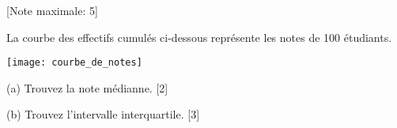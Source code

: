 \begin{question}
  \hspace*{\fill} [Note maximale: 5]\par
  \noindent La courbe des effectifs cumulés ci-dessous représente les notes de 100 étudiants.\par

  \texttt{[image: courbe\_de\_notes]}  

  (a) Trouvez la note médianne.\hspace*{\fill} [2]\par
  (b) Trouvez l'intervalle interquartile.\hspace*{\fill} [3]\par
  
\end{question}

